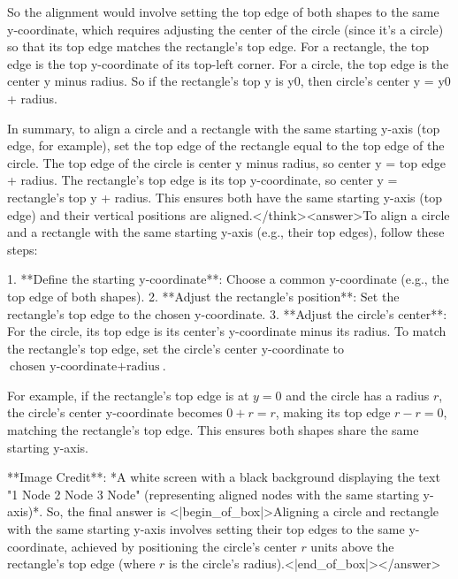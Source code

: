 So the alignment would involve setting the top edge of both shapes to the same y-coordinate, which requires adjusting the center of the circle (since it's a circle) so that its top edge matches the rectangle's top edge. For a rectangle, the top edge is the top y-coordinate of its top-left corner. For a circle, the top edge is the center y minus radius. So if the rectangle's top y is y0, then circle's center y = y0 + radius. 

In summary, to align a circle and a rectangle with the same starting y-axis (top edge, for example), set the top edge of the rectangle equal to the top edge of the circle. The top edge of the circle is center y minus radius, so center y = top edge + radius. The rectangle's top edge is its top y-coordinate, so center y = rectangle's top y + radius. This ensures both have the same starting y-axis (top edge) and their vertical positions are aligned.</think><answer>To align a circle and a rectangle with the same starting y-axis (e.g., their top edges), follow these steps:  

1. **Define the starting y-coordinate**: Choose a common y-coordinate (e.g., the top edge of both shapes).  
2. **Adjust the rectangle’s position**: Set the rectangle’s top edge to the chosen y-coordinate.  
3. **Adjust the circle’s center**: For the circle, its top edge is its center’s y-coordinate minus its radius. To match the rectangle’s top edge, set the circle’s center y-coordinate to \( \text{chosen y-coordinate} + \text{radius} \).  

For example, if the rectangle’s top edge is at \( y = 0 \) and the circle has a radius \( r \), the circle’s center y-coordinate becomes \( 0 + r = r \), making its top edge \( r - r = 0 \), matching the rectangle’s top edge. This ensures both shapes share the same starting y-axis.  

**Image Credit**: *A white screen with a black background displaying the text "1 Node 2 Node 3 Node" (representing aligned nodes with the same starting y-axis)*.  
So, the final answer is <|begin_of_box|>Aligning a circle and rectangle with the same starting y-axis involves setting their top edges to the same y-coordinate, achieved by positioning the circle’s center \( r \) units above the rectangle’s top edge (where \( r \) is the circle’s radius).<|end_of_box|></answer>